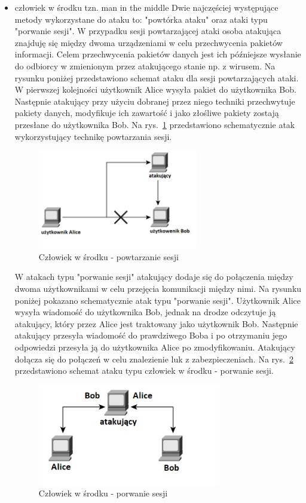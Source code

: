 \documentclass[12p]{article}
\begin{document}
\begin{itemize}
\item człowiek w środku tzn. man in the middle
\newline Dwie najczęściej występujące metody wykorzystane do ataku to: "powtórka ataku" oraz ataki typu "porwanie sesji". W przypadku sesji powtarzającej ataki osoba atakująca znajduję się między dwoma urządzeniami w celu przechwycenia pakietów informacji. Celem przechwycenia pakietów danych jest ich późniejsze wysłanie do odbiorcy w zmienionym przez atakującego stanie np. z wirusem. Na rysunku poniżej przedstawiono schemat ataku dla sesji powtarzających ataki. W pierwszej kolejności użytkownik Alice wysyła pakiet do użytkownika Bob. Następnie atakujący przy użyciu dobranej przez niego techniki przechwytuje pakiety danych, modyfikuje ich zawartość i jako złośliwe pakiety zostają przesłane do użytkownika Bob. Na rys.~\ref{Powtarzajace_ataki} przedstawiono schematycznie atak wykorzystujący technikę powtarzania sesji.
\begin{figure}[h]
\centering
\includegraphics[width=7cm]{Powtarzajace_ataki.jpg}
\caption{Człowiek w środku - powtarzanie sesji}\label{Powtarzajace_ataki}
\end{figure}

\quad W atakach typu "porwanie sesji" atakujący dodaje się do połączenia między dwoma użytkownikami w celu przejęcia komunikacji między nimi. Na rysunku poniżej pokazano schematycznie atak typu "porwanie sesji". Użytkownik Alice wysyła wiadomość do użytkownika Bob, jednak na drodze odczytuje ją atakujący, który przez Alice jest traktowany jako użytkownik Bob. Następnie atakujący przesyła wiadomość do prawdziwego Boba i po otrzymaniu jego odpowiedzi przesyła ją do użytkownika Alice po zmodyfikowaniu. Atakujący dołącza się do połączeń w celu znalezienie luk z zabezpieczeniach. Na rys.~\ref{Porwanie_sesji} przedstawiono schemat ataku typu człowiek w środku - porwanie sesji.
\begin{figure}[h]
\centering
\includegraphics[width=8cm]{Porwanie_sesji.jpg}
\caption{Człowiek w środku - porwanie sesji}\label{Porwanie_sesji}
\end{figure}


\end{itemize}
\end{document}
